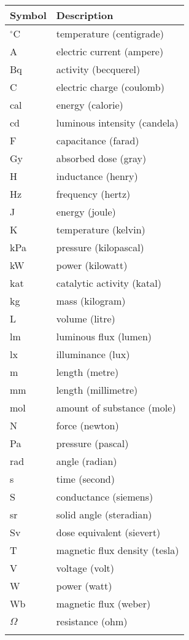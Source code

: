 \documentclass[12pt]{article}
\begin{document}
\begin{longtable*}{l l}
\toprule
Symbol & Description
\\
\midrule
${}^{\circ}$C & temperature (centigrade)
\\
A & electric current (ampere)
\\
Bq & activity (becquerel)
\\
C & electric charge (coulomb)
\\
cal & energy (calorie)
\\
cd & luminous intensity (candela)
\\
F & capacitance (farad)
\\
Gy & absorbed dose (gray)
\\
H & inductance (henry)
\\
Hz & frequency (hertz)
\\
J & energy (joule)
\\
K & temperature (kelvin)
\\
kPa & pressure (kilopascal)
\\
kW & power (kilowatt)
\\
kat & catalytic activity (katal)
\\
kg & mass (kilogram)
\\
L & volume (litre)
\\
lm & luminous flux (lumen)
\\
lx & illuminance (lux)
\\
m & length (metre)
\\
mm & length (millimetre)
\\
mol & amount of substance (mole)
\\
N & force (newton)
\\
Pa & pressure (pascal)
\\
rad & angle (radian)
\\
s & time (second)
\\
S & conductance (siemens)
\\
sr & solid angle (steradian)
\\
Sv & dose equivalent (sievert)
\\
T & magnetic flux density (tesla)
\\
V & voltage (volt)
\\
W & power (watt)
\\
Wb & magnetic flux (weber)
\\
$\Omega{}$ & resistance (ohm)
\\
\bottomrule
\label{Table:ToU}
\end{longtable*}
\end{document}
